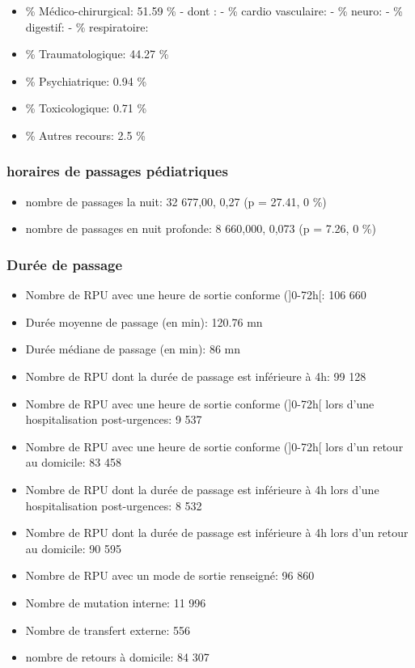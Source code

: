 \documentclass[]{article}
\begin{document}
\begin{itemize}
\itemsep1pt\parskip0pt
\item
  \% Médico-chirurgical: 51.59 \% - dont : - \% cardio vasculaire: - \%
  neuro: - \% digestif: - \% respiratoire:
\item
  \% Traumatologique: 44.27 \%
\item
  \% Psychiatrique: 0.94 \%
\item
  \% Toxicologique: 0.71 \%
\item
  \% Autres recours: 2.5 \%
\end{itemize}

\subsubsection{horaires de passages
pédiatriques}\label{horaires-de-passages-pediatriques}

\begin{itemize}
\itemsep1pt\parskip0pt
\item
  nombre de passages la nuit: 32 677,00, 0,27 (p = 27.41, 0 \%)
\item
  nombre de passages en nuit profonde: 8 660,000, 0,073 (p = 7.26, 0 \%)
\end{itemize}

\subsubsection{Durée de passage}\label{duree-de-passage}

\begin{itemize}
\item
  Nombre de RPU avec une heure de sortie conforme ({]}0-72h{[}: 106 660
\item
  Durée moyenne de passage (en min): 120.76 mn
\item
  Durée médiane de passage (en min): 86 mn
\item
  Nombre de RPU dont la durée de passage est inférieure à 4h: 99 128
\item
  Nombre de RPU avec une heure de sortie conforme ({]}0-72h{[} lors
  d'une hospitalisation post-urgences: 9 537
\item
  Nombre de RPU avec une heure de sortie conforme ({]}0-72h{[} lors d'un
  retour au domicile: 83 458
\item
  Nombre de RPU dont la durée de passage est inférieure à 4h lors d'une
  hospitalisation post-urgences: 8 532
\item
  Nombre de RPU dont la durée de passage est inférieure à 4h lors d'un
  retour au domicile: 90 595
\item
  Nombre de RPU avec un mode de sortie renseigné: 96 860
\item
  Nombre de mutation interne: 11 996
\item
  Nombre de transfert externe: 556
\item
  nombre de retours à domicile: 84 307
\end{itemize}
\end{document}
